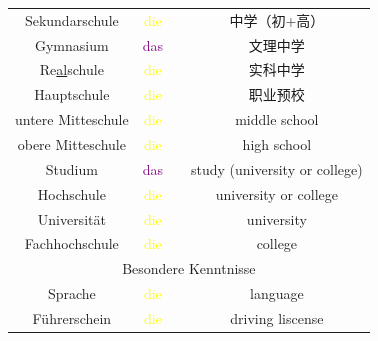 \begin{center}
\begin{longtable} {|c|c|c|c|}
        \hline
        Sekundarschule         & \textcolor{yellow}{die} &                        & 中学（初+高）                       \\
        Gymnasium              & \textcolor{purple}{das} &                        & 文理中学                          \\
        Re\underline{al}schule & \textcolor{yellow}{die} &                        & 实科中学                          \\
        Hauptschule            & \textcolor{yellow}{die} &                        & 职业预校                          \\
        untere Mitteschule     & \textcolor{yellow}{die} &                        & middle school                 \\
        obere Mitteschule      & \textcolor{yellow}{die} &                        & high school                   \\
        \hline
        Studium                & \textcolor{purple}{das} &                        & study (university or college) \\
        Hochschule             & \textcolor{yellow}{die} &                        & university or college         \\
        Universität            & \textcolor{yellow}{die} &                        & university                    \\
        Fachhochschule         & \textcolor{yellow}{die} &                        & college                       \\
        \hline
        \multicolumn{4}{|c|}{Besondere Kenntnisse}                                                                \\
        \hline
        Sprache                & \textcolor{yellow}{die} &                        & language                      \\
        Führerschein           & \textcolor{yellow}{die} &                        & driving liscense              \\
        \hline
    \end{longtable}
\end{center}

